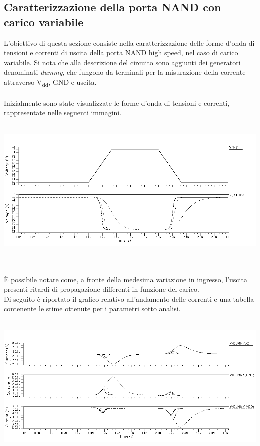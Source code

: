\documentclass[11pt,  english, makeidx, a4paper, titlepage, oneside]{book}
\begin{document}
\subsection{Caratterizzazione della porta NAND con carico variabile}
L'obiettivo di questa sezione consiste nella caratterizzazione delle forme d'onda di tensioni e correnti di uscita della porta NAND high speed, nel caso di carico variabile. Si nota che alla descrizione del circuito sono aggiunti dei generatori denominati \textit{dummy}, che fungono da terminali per la misurazione della corrente attraverso V\textsubscript{dd}, GND e uscita.
\\\\
Inizialmente sono state visualizzate le forme d'onda di tensioni e correnti, rappresentate nelle seguenti immagini.
\\\\
\centerline{\includegraphics[width=14cm]{./img/Lab_5/waveform_2.png}}
\\\\
È possibile notare come, a fronte della medesima variazione in ingresso, l'uscita presenti ritardi di propagazione differenti in funzione del carico.
\\
Di seguito è riportato il grafico relativo all'andamento delle correnti e una tabella contenente le stime ottenute per i parametri sotto analisi.
\\\\
\centerline{\includegraphics[width=14cm]{./img/Lab_5/waveform_3.png}}
\end{document}
